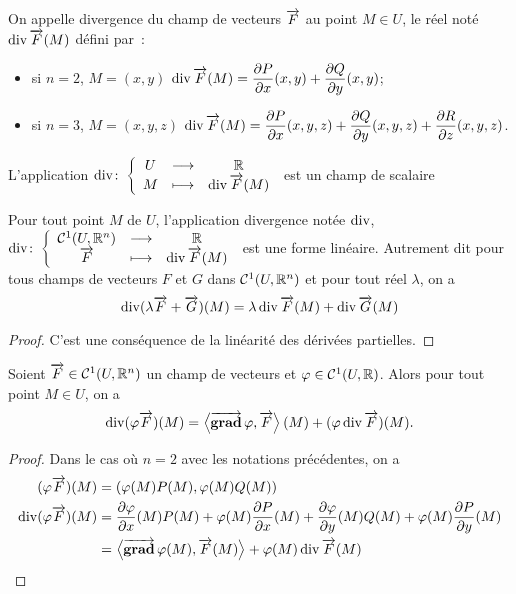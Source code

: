 \begin{defdef}
  On appelle divergence du champ de vecteurs \(\overrightarrow{F}\) au point \(M \in U\), le réel noté \(\operatorname{div} \overrightarrow{F}(M)\) défini par~:
  \begin{itemize}
  \item si \(n=2\), \(M=(x,y)\) \(\operatorname{div} \overrightarrow{F}(M)=\dfrac{\partial{} P}{\partial{} x}(x,y) + \dfrac{\partial{} Q}{\partial{} y}(x,y)\);
  \item si \(n=3\), \(M=(x,y,z)\) \(\operatorname{div} \overrightarrow{F}(M)=\dfrac{\partial{} P}{\partial{} x}(x,y,z) + \dfrac{\partial{} Q}{\partial{} y}(x,y,z) + \dfrac{\partial{} R}{\partial{} z}(x,y,z)\).
  \end{itemize}
  L'application \(\operatorname{div}\colon \left\{\begin{array}{ccc} U & \longrightarrow &\mathbb{R}\\ M & \longmapsto & \operatorname{div} \overrightarrow{F}(M) \end{array} \right.\) est un champ de scalaire
\end{defdef}
%
\begin{prop}
  Pour tout point \(M\) de \(U\), l'application divergence notée \(\operatorname{div}\), \(\operatorname{div}\colon \left\{\begin{array}{ccc} \mathcal{C}^{1}(U, \mathbb{R}^n) & \longrightarrow &\mathbb{R}\\ \overrightarrow{F} & \longmapsto & \operatorname{div}\overrightarrow{F}(M) \end{array} \right.\) est une forme linéaire. Autrement dit pour tous champs de vecteurs \(F\) et \(G\) dans \(\mathcal{C}^{1}(U, \mathbb{R}^n)\) et pour tout réel \(\lambda\), on a
  \begin{equation}
    \operatorname{div}(\lambda \overrightarrow{F} + \overrightarrow{G})(M) = \lambda \operatorname{div} \overrightarrow{F}(M) + \operatorname{div} \overrightarrow{G}(M)
  \end{equation}
\end{prop}
\begin{proof}
  C'est une conséquence de la linéarité des dérivées partielles.
\end{proof}
%
\begin{prop}
  Soient \(\overrightarrow{F} \in \mathcal{C}^{1}(U, \mathbb{R}^n)\) un champ de vecteurs et \(\varphi \in \mathcal{C}^{1}(U, \mathbb{R})\). Alors pour tout point \(M \in U\), on a
  \begin{equation}
    \operatorname{div}(\varphi \overrightarrow{F})(M)=\left\langle{\operatorname{\overrightarrow{\mathbf{grad}}}{\varphi}},{\overrightarrow{F}}\right\rangle(M) + (\varphi \operatorname{div} \overrightarrow{F})(M).
  \end{equation}
\end{prop}
\begin{proof}
  Dans le cas où \(n=2\) avec les notations précédentes, on a
  \begin{align}
    (\varphi \overrightarrow{F})(M)& = (\varphi(M) P(M), \varphi(M) Q(M)) \\
    \operatorname{div}(\varphi \overrightarrow{F})(M)& = \dfrac{\partial{} \varphi}{\partial{} x}(M)  P(M) + \varphi(M) \dfrac{\partial{} P}{\partial{} x}(M) + \dfrac{\partial{} \varphi}{\partial{} y}(M)  Q(M) + \varphi(M) \dfrac{\partial{} P}{\partial{} y}(M) \\
    &=\left\langle{\operatorname{\overrightarrow{\mathbf{grad}}}{\varphi}(M)},{\overrightarrow{F}(M)}\right\rangle + \varphi(M)\operatorname{div}\overrightarrow{F}(M)
  \end{align}
\end{proof}

